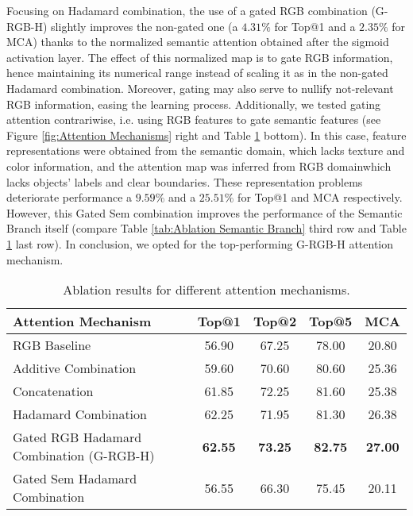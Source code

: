 \documentclass[review, 3p, sort&compress]{elsarticle}
\begin{document}
Focusing on Hadamard combination, the use of a gated RGB combination (G-RGB-H) slightly improves the non-gated one (a \(4.31\%\) for Top@1 and a \(2.35\%\) for MCA) thanks to the normalized semantic attention obtained after the sigmoid activation layer. The effect of this normalized map is to gate RGB information, hence maintaining its numerical range instead of scaling it as in the non-gated Hadamard combination. Moreover, gating may also serve to nullify not-relevant RGB information, easing the learning process. Additionally, we tested gating attention contrariwise, i.e. using RGB features to gate semantic features (see Figure \ref{fig:Attention Mechanisms} right and Table \ref{tab:Attention Mechanisms} bottom). In this case, feature representations were obtained from the semantic domain, which lacks texture and color information, and the attention map was inferred from RGB domain\textemdash which lacks objects' labels and clear boundaries. These representation problems deteriorate performance a \(9.59\%\) and a \(25.51\%\) for Top@1 and MCA respectively. However, this Gated Sem combination improves the performance of the Semantic Branch itself (compare Table \ref{tab:Ablation Semantic Branch} third row and Table \ref{tab:Attention Mechanisms} last row). In conclusion, we opted for the top-performing G-RGB-H attention mechanism. 

\begin{table}[t!]
    \begin{centering}
    \renewcommand{\arraystretch}{1.2}
    \footnotesize
    \begin{tabular}{lcccc}
        \hline 
        Attention Mechanism & Top@1 & Top@2 & Top@5 & MCA\tabularnewline
        \hline 
        RGB Baseline &  56.90 & 67.25 & 78.00 & 20.80\tabularnewline
        Additive Combination &  59.60 & 70.60 & 80.60 & 25.36\tabularnewline
        Concatenation & 61.85 & 72.25 & 81.60 & 25.38\tabularnewline
        Hadamard Combination & 62.25 & 71.95 & 81.30 & 26.38\tabularnewline
        Gated RGB Hadamard Combination (G-RGB-H) & \textbf{62.55} & \textbf{73.25} & \textbf{82.75} & \textbf{27.00}\tabularnewline
        \hline 
        Gated Sem Hadamard Combination & 56.55 & 66.30 & 75.45 & 20.11\tabularnewline
        \hline 
    \end{tabular}
    \caption{Ablation results for different attention mechanisms.}
    \label{tab:Attention Mechanisms}
    \par
    \end{centering}
\end{table}
\end{document}
